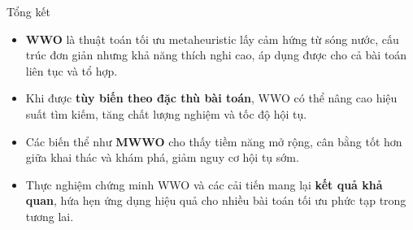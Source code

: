 \begin{frame}{Tổng kết}
\begin{itemize}
    \item \textbf{WWO} là thuật toán tối ưu metaheuristic lấy cảm hứng từ sóng nước, cấu trúc đơn giản nhưng khả năng thích nghi cao, áp dụng được cho cả bài toán liên tục và tổ hợp.
    \item Khi được \textbf{tùy biến theo đặc thù bài toán}, WWO có thể nâng cao hiệu suất tìm kiếm, tăng chất lượng nghiệm và tốc độ hội tụ.
    \item Các biến thể như \textbf{MWWO} cho thấy tiềm năng mở rộng, cân bằng tốt hơn giữa khai thác và khám phá, giảm nguy cơ hội tụ sớm.
    \item Thực nghiệm chứng minh WWO và các cải tiến mang lại \textbf{kết quả khả quan}, hứa hẹn ứng dụng hiệu quả cho nhiều bài toán tối ưu phức tạp trong tương lai.
\end{itemize}
\end{frame}
